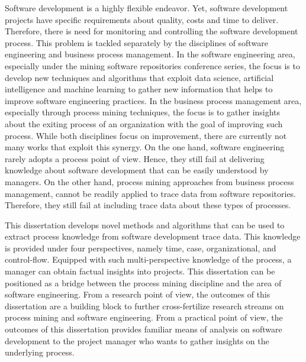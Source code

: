 

Software development is a highly flexible endeavor. Yet, software development projects
have specific requirements about quality, costs and time to deliver. Therefore, there is need
for monitoring and controlling the software development process. This problem is tackled
separately by the disciplines of software engineering and business process management. In the software engineering area, especially under the mining software repositories conference series, the focus is to develop new techniques and algorithms that exploit data science, artificial intelligence and machine learning to gather new information that helps to improve software engineering practices. In the business process management area, especially through process mining techniques, the focus is to gather insights about the exiting process of an organization with the goal of improving such process. While both disciplines focus on improvement, there are currently not many works that exploit this synergy.
On the one hand, software engineering rarely adopts a process point of view. Hence, they still fail at delivering knowledge about software development that can be easily understood by managers. On the other hand, process mining approaches from business process management, cannot be readily applied to trace data from software repositories. Therefore, they still fail at including trace data about these types of processes. 
 
This dissertation develops novel methods and algorithms that can be used to extract process knowledge from software development trace data. This knowledge is provided under four perspectives, namely time, case, organizational, and control-flow. Equipped with such multi-perspective knowledge of the process, a manager can obtain factual insights into projects. This dissertation can be positioned as a bridge between the process mining discipline and the area of software engineering. From a research point of view, the outcomes of this dissertation are a building block to further cross-fertilize research streams on process mining and software engineering. From a practical
point of view, the outcomes of this dissertation provides familiar means of analysis on software development to the project manager who wants to gather insights on the underlying process.


%	

